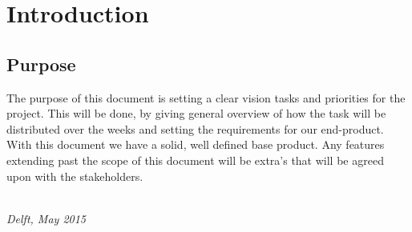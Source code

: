 \chapter{Introduction}

\section*{Purpose}
The purpose of this document is setting a clear vision tasks and priorities for the project. This will be done, by giving general overview of how the task will be distributed over the weeks and setting the requirements for our end-product. With this document we have a solid, well defined base product. Any features extending past the scope of this document will be extra's that will be agreed upon with the stakeholders.
\begin{flushright}
{\makeatletter\itshape
    \@author \\
    Delft, May 2015
\makeatother}
\end{flushright}

